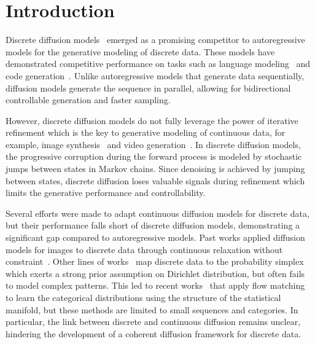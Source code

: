 \section{Introduction}
Discrete diffusion models~\citep{austin2021d3pm,lou2024sedd} emerged as a promising competitor to autoregressive models for the generative modeling of discrete data. These models have demonstrated competitive performance on tasks such as language modeling~\citep{shi2024md4,sahoo2024simple} and code generation~\citep{gat2024discrete}.
Unlike autoregressive models that generate data sequentially, diffusion models generate the sequence in parallel, allowing for bidirectional controllable generation and faster sampling.


However, discrete diffusion models do not fully leverage the power of iterative refinement which is the key to generative modeling of continuous data, for example, image synthesis~\citep{saharia2022image,esser2024image} and video generation~\citep{polyak2024moviegen,brooks2024video}.
In discrete diffusion models, the progressive corruption during the forward process is modeled by stochastic jumps between states in Markov chains.
Since denoising is achieved by jumping between states, discrete diffusion loses valuable signals during refinement which limits the generative performance and controllability.



Several efforts were made to adapt continuous diffusion models for discrete data, but their performance falls short of discrete diffusion models, demonstrating a significant gap compared to autoregressive models. 
Past works applied diffusion models for images to discrete data through continuous relaxation without constraint~\citep{han2022ssd,li2022diffusion}. 
Other lines of works~\citep{avdeyev2023dirichlet,stark2024dirichlet} map discrete data to the probability simplex which exerts a strong prior assumption on Dirichlet distribution, but often fails to model complex patterns.
This led to recent works~\citep{cheng2024categorical,davis2024fisherflow} that apply flow matching to learn the categorical distributions using the structure of the statistical manifold, but these methods are limited to small sequences and categories.
In particular, the link between discrete and continuous diffusion remains unclear, hindering the development of a coherent diffusion framework for discrete data.


